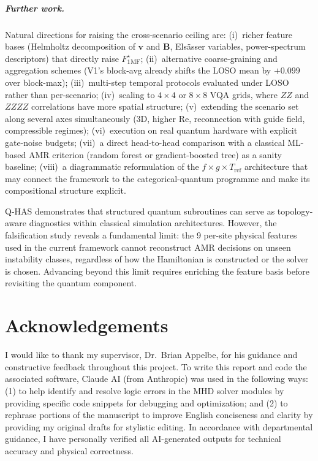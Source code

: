 \documentclass[12pt, a4paper, oneside]{report}
\begin{document}
\paragraph{Further work.}
Natural directions for raising the cross-scenario ceiling are: (i)~richer feature bases (Helmholtz decomposition of $\mathbf{v}$ and $\mathbf{B}$, Els\"asser variables, power-spectrum descriptors) that directly raise $F_1^\star_{\mathrm{MF}}$; (ii)~alternative coarse-graining and aggregation schemes (V1's block-avg already shifts the LOSO mean by $+0.099$ over block-max); (iii)~multi-step temporal protocols evaluated under LOSO rather than per-scenario; (iv)~scaling to $4 \times 4$ or $8 \times 8$ VQA grids, where $ZZ$ and $ZZZZ$ correlations have more spatial structure; (v)~extending the scenario set along several axes simultaneously (3D, higher $\mathrm{Re}$, reconnection with guide field, compressible regimes); (vi)~execution on real quantum hardware with explicit gate-noise budgets; (vii)~a direct head-to-head comparison with a classical ML-based AMR criterion (random forest or gradient-boosted tree) as a sanity baseline; (viii)~a diagrammatic reformulation of the $f \times g \times T_{\mathrm{rcf}}$ architecture that may connect the framework to the categorical-quantum programme \cite{nielsen2010,schuld2021effect} and make its compositional structure explicit.

Q-HAS demonstrates that structured quantum subroutines can serve as topology-aware diagnostics within classical simulation architectures. However, the falsification study reveals a fundamental limit: the 9 per-site physical features used in the current framework cannot reconstruct AMR decisions on unseen instability classes, regardless of how the Hamiltonian is constructed or the solver is chosen. Advancing beyond this limit requires enriching the feature basis before revisiting the quantum component.

\chapter*{Acknowledgements}

I would like to thank my supervisor, Dr.\ Brian Appelbe, for his guidance and constructive feedback throughout this project. To write this report and code the associated software, Claude AI (from Anthropic) was used in the following ways: (1) to help identify and resolve logic errors in the MHD solver modules by providing specific code snippets for debugging and optimization; and (2) to rephrase portions of the manuscript to improve English conciseness and clarity by providing my original drafts for stylistic editing. In accordance with departmental guidance, I have personally verified all AI-generated outputs for technical accuracy and physical correctness.
\end{document}
